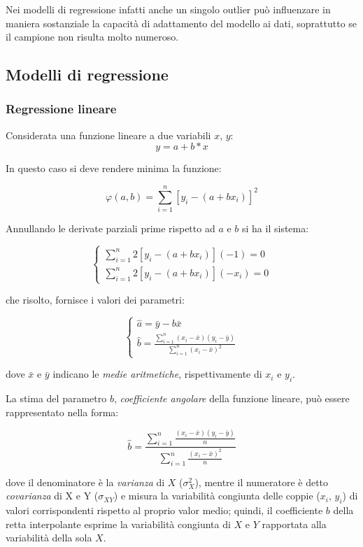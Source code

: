 Nei modelli di regressione infatti anche un singolo outlier può influenzare in maniera sostanziale la capacità di adattamento del modello ai dati, soprattutto se il campione non risulta molto numeroso.

\subsection{Modelli di regressione}\label{ssec:regressione-modelli}

\subsubsection{Regressione lineare}\label{sssec:regressione-lineare}
Considerata una funzione lineare a due variabili $x$, $y$:
$$y = a + b*x$$

In questo caso si deve rendere minima la funzione:

$$\varphi(a, b)=\sum_{i=1}^{n}\left[y_{i}-\left(a+b x_{i}\right)\right]^{2}$$\smallskip

Annullando le derivate parziali prime rispetto ad $a$ e $b$ si ha il sistema:

$$\left\{\begin{array}{l}
\sum_{i=1}^{n} 2\left[y_{i}-\left(a+b x_{i}\right)\right](-1)=0 \\
\sum_{i=1}^{n} 2\left[y_{i}-\left(a+b x_{i}\right)\right]\left(-x_{i}\right)=0
\end{array}\right.$$\smallskip

che risolto, fornisce i valori dei parametri:

$$\left\{\begin{array}{l}
\hat{a}=\bar{y}-b \bar{x} \\
\hat{b}=\frac{\sum_{i=1}^{n}\left(x_{i}-\bar{x}\right)\left(y_{i}-\bar{y}\right)}{\sum_{i=1}^{n}\left(x_{i}-\bar{x}\right)^{2}}
\end{array}\right.$$\smallskip

dove $\bar{x}$ e $\bar{y}$ indicano le \textit{medie aritmetiche}, rispettivamente di $x_i$ e $y_i$.

La stima del parametro $b$, \textit{coefficiente angolare} della funzione lineare, può essere rappresentato nella forma:

$$\hat{b}=\frac{\sum_{i=1}^{n} \frac{\left(x_{i}-\bar{x}\right)\left(y_{i}-\bar{y}\right)}{n}}{\sum_{i=1}^{n} \frac{\left(x_{i}-\bar{x}\right)^{2}}{n}}$$\smallskip

dove il denominatore è la \textit{varianza} di $X$ ($\sigma_{X}^{2}$), mentre il numeratore è detto \textit{covarianza} di X e Y ($\sigma_{XY}$) e misura la variabilità congiunta delle coppie ($x_i$, $y_i$) di valori corrispondenti rispetto al proprio valor medio; quindi, il coefficiente $b$ della retta interpolante esprime la variabilità congiunta di $X$ e $Y$ rapportata alla variabilità della sola $X$. \cite{Neter1996}

